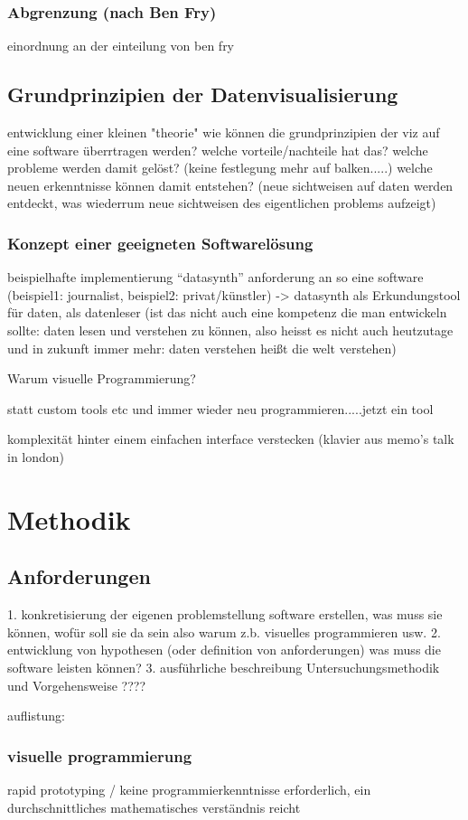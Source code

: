 \documentclass[a4paper, 12pt, onepage, pdftex, headsepline, footsepline]{scrreprt}
\begin{document}
\subsection{Abgrenzung (nach Ben Fry)}
einordnung an der einteilung von ben fry
\section{Grundprinzipien der Datenvisualisierung}
entwicklung einer kleinen "theorie"
wie können die grundprinzipien der viz auf eine software überrtragen werden?
welche vorteile/nachteile hat das?
welche probleme werden damit gelöst? (keine festlegung mehr auf balken.....)
welche neuen erkenntnisse können damit entstehen? (neue sichtweisen auf daten werden entdeckt, was wiederrum neue sichtweisen des eigentlichen problems aufzeigt)
\subsection{Konzept einer geeigneten Softwarelösung}
beispielhafte implementierung “datasynth”
anforderung an so eine software (beispiel1: journalist, beispiel2: privat/künstler)
-> datasynth als Erkundungstool für daten, als datenleser (ist das nicht auch eine kompetenz die man entwickeln sollte: daten lesen und verstehen zu können, also heisst es nicht auch heutzutage und in zukunft immer mehr: daten verstehen heißt die welt verstehen)

Warum visuelle Programmierung?

statt custom tools etc und immer wieder neu programmieren.....jetzt ein tool

komplexität hinter einem einfachen interface verstecken (klavier aus memo’s talk in london)

\chapter{Methodik}
\section{Anforderungen}
1. konkretisierung der eigenen problemstellung
software erstellen, was muss sie können, wofür soll sie da sein
also warum z.b. visuelles programmieren usw.
2. entwicklung von hypothesen (oder definition von anforderungen)
was muss die software leisten können?
3. ausführliche beschreibung Untersuchungsmethodik und Vorgehensweise
????

auflistung:
\subsection{visuelle programmierung}
rapid prototyping / keine programmierkenntnisse erforderlich, ein durchschnittliches mathematisches verständnis reicht
\end{document}
